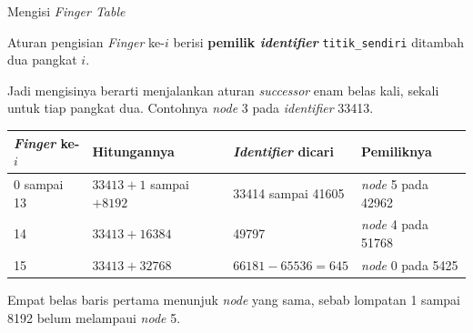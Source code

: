 \documentclass[aspectratio=169, table, 12pt]{beamer}
\begin{document}
\begin{frame}{{\Large Mengisi \textit{Finger Table}}}
  \vspace{6pt}
  \begin{block}{Aturan pengisian}
    \textit{Finger} ke-$i$ berisi \textbf{pemilik \textit{identifier}} \texttt{titik\_sendiri} ditambah
    dua pangkat $i$.
  \end{block}
  \vspace{4pt}
  {\small Jadi mengisinya berarti menjalankan aturan \textit{successor} enam belas kali,
  sekali untuk tiap pangkat dua. Contohnya \textit{node} 3 pada \textit{identifier} 33413.}
  \vspace{4pt}
  \centering
  \scriptsize
  \begin{tabularx}{0.95\textwidth}{|l|l|l|X|}
    \hline
    \textbf{\textit{Finger} ke-$i$} & \textbf{Hitungannya} & \textbf{\textit{Identifier} dicari} & \textbf{Pemiliknya} \\
    \hline
    0 sampai 13 & $33413 + 1$ sampai $+8192$ & 33414 sampai 41605 & \textit{node} 5 pada 42962 \\
    \hline
    14 & $33413 + 16384$ & 49797 & \textit{node} 4 pada 51768 \\
    \hline
    15 & $33413 + 32768$ & $66181 - 65536 = 645$ & \textit{node} 0 pada 5425 \\
    \hline
  \end{tabularx}

  \vspace{5pt}
  {\footnotesize Empat belas baris pertama menunjuk \textit{node} yang sama,
  sebab lompatan 1 sampai 8192 belum melampaui \textit{node} 5.}
\end{frame}
\end{document}
